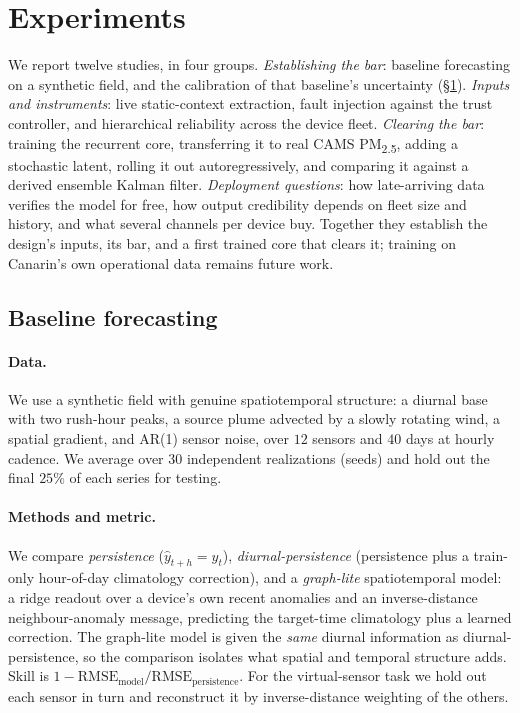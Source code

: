 \documentclass[10pt]{article}
\begin{document}
\section{Experiments}
\label{sec:exp}
We report twelve studies, in four groups.
\emph{Establishing the bar}: baseline forecasting on a synthetic field, and the
calibration of that baseline's uncertainty (\S\ref{sec:exp}).
\emph{Inputs and instruments}: live static-context extraction, fault injection
against the trust controller, and hierarchical reliability across the device
fleet.
\emph{Clearing the bar}: training the recurrent core, transferring it to real
CAMS PM\textsubscript{2.5}, adding a stochastic latent, rolling it out
autoregressively, and comparing it against a derived ensemble Kalman filter.
\emph{Deployment questions}: how late-arriving data verifies the model for free,
how output credibility depends on fleet size and history, and what several
channels per device buy.
Together they establish the design's inputs, its bar, and a first trained core
that clears it; training on Canarin's own operational data remains future work.

\subsection{Baseline forecasting}
\paragraph{Data.}
We use a synthetic field with genuine spatiotemporal structure: a diurnal base
with two rush-hour peaks, a source plume advected by a slowly rotating wind, a
spatial gradient, and AR(1) sensor noise, over $12$ sensors and $40$ days at
hourly cadence. We average over $30$ independent realizations (seeds) and hold out
the final $25\%$ of each series for testing.

\paragraph{Methods and metric.}
We compare \emph{persistence} ($\hat y_{t+h}=y_t$), \emph{diurnal-persistence}
(persistence plus a train-only hour-of-day climatology correction), and a
\emph{graph-lite} spatiotemporal model: a ridge readout over a device's own recent
anomalies and an inverse-distance neighbour-anomaly message, predicting the
target-time climatology plus a learned correction. The graph-lite model is given
the \emph{same} diurnal information as diurnal-persistence, so the comparison
isolates what spatial and temporal structure adds. Skill is
$1-\mathrm{RMSE}_{\text{model}}/\mathrm{RMSE}_{\text{persistence}}$. For the
virtual-sensor task we hold out each sensor in turn and reconstruct it by
inverse-distance weighting of the others.
\end{document}
